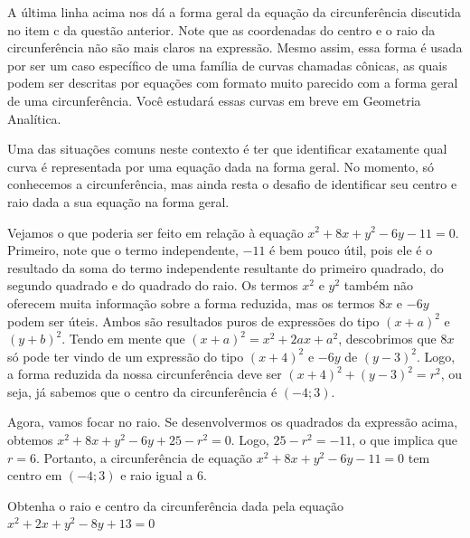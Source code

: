 \documentclass[main.tex]{subfiles}
\begin{document}
A última linha acima nos dá a forma geral da equação da circunferência discutida no item c da questão anterior. Note que as coordenadas do centro e o raio da circunferência não são mais claros na expressão. Mesmo assim, essa forma é usada por ser um caso específico de uma família de curvas chamadas cônicas, as quais podem ser descritas por equações com formato muito parecido com a forma geral de uma circunferência. Você estudará essas curvas em breve em Geometria Analítica.

Uma das situações comuns neste contexto é ter que identificar exatamente qual curva é representada por uma equação dada na forma geral. No momento, só conhecemos a circunferência, mas ainda resta o desafio de identificar seu centro e raio dada a sua equação na forma geral.

Vejamos o que poderia ser feito em relação à equação $x^2+8x+y^2-6y-11=0$. Primeiro, note que o termo independente, $-11$ é bem pouco útil, pois ele é o resultado da soma do termo independente resultante do primeiro quadrado, do segundo quadrado e do quadrado do raio. Os termos $x^2$ e $y^2$ também não oferecem muita informação sobre a forma reduzida, mas os termos $8x$ e $-6y$ podem ser úteis. Ambos são resultados puros de expressões do tipo $(x+a)^2$ e $(y+b)^2$. Tendo em mente que $(x+a)^2=x^2+2ax+a^2$, descobrimos que $8x$ só pode ter vindo de um expressão do tipo $(x+4)^2$ e $-6y$ de $(y-3)^2$. Logo, a forma reduzida da nossa circunferência deve ser $(x+4)^2+(y-3)^2=r^2$, ou seja, já sabemos que o centro da circunferência é $(-4;3)$.

Agora, vamos focar no raio. Se desenvolvermos os quadrados da expressão acima, obtemos $x^2+8x+y^2-6y+25-r^2=0$. Logo, $25-r^2=-11$, o que implica que $r=6$. Portanto, a circunferência de equação $x^2+8x+y^2-6y-11=0$ tem centro em $(-4;3)$ e raio igual a $6$.

\begin{questao}
Obtenha o raio e centro da circunferência dada pela equação $x^2+2x+y^2-8y+13=0$
\end{questao}

\end{document}
